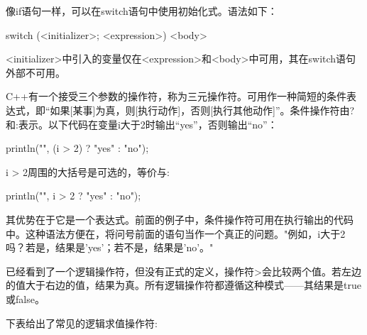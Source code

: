 
像if语句一样，可以在switch语句中使用初始化式。语法如下：

\begin{cpp}
switch (<initializer>; <expression>) { <body> }
\end{cpp}

<initializer>中引入的变量仅在<expression>和<body>中可用，其在switch语句外部不可用。


C++有一个接受三个参数的操作符，称为三元操作符。可用作一种简短的条件表达式，即“如果[某事]为真，则[执行动作]，否则[执行其他动作]”。条件操作符由?和:表示。以下代码在变量i大于2时输出“yes”，否则输出“no”：

\begin{cpp}
println("{}", (i > 2) ? "yes" : "no");
\end{cpp}

i > 2周围的大括号是可选的，等价与:

\begin{cpp}
println("{}", i > 2 ? "yes" : "no");
\end{cpp}

其优势在于它是一个表达式。前面的例子中，条件操作符可用在执行输出的代码中。这种语法方便在，将问号前面的语句当作一个真正的问题。"例如，i大于2吗？若是，结果是'yes'；若不是，结果是'no'。"


已经看到了一个逻辑操作符，但没有正式的定义，操作符>会比较两个值。若左边的值大于右边的值，结果为真。所有逻辑操作符都遵循这种模式——其结果是true或false。

下表给出了常见的逻辑求值操作符:

